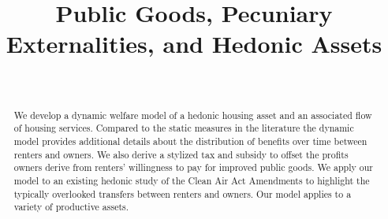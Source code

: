 \documentclass[ecta,nameyear,draft]{econsocart}
\theoremstyle{plain}
\theoremstyle{remark}
\begin{document}
\begin{frontmatter}

\title{Public Goods, Pecuniary Externalities, and Hedonic Assets}

\begin{aug}
%
%
%
\author[id=au1,addressref={add1}]{~}
\address[id=add1]{%
,
}


\end{aug}

\support{%
}
%
\begin{abstract} %
We develop a dynamic welfare model of a hedonic housing asset and an associated flow of housing  services. Compared to the static measures in the literature the dynamic model provides additional details about the distribution of benefits over time between renters and owners. We also derive a stylized tax and subsidy to offset the profits owners derive from renters’ willingness to pay for improved public goods. We apply our model to an existing hedonic study of the Clean Air Act Amendments to highlight the typically overlooked transfers between renters and owners. Our model applies to a variety of productive assets.
\end{abstract}

\begin{keyword}
\end{keyword}

\end{frontmatter}
\end{document}
